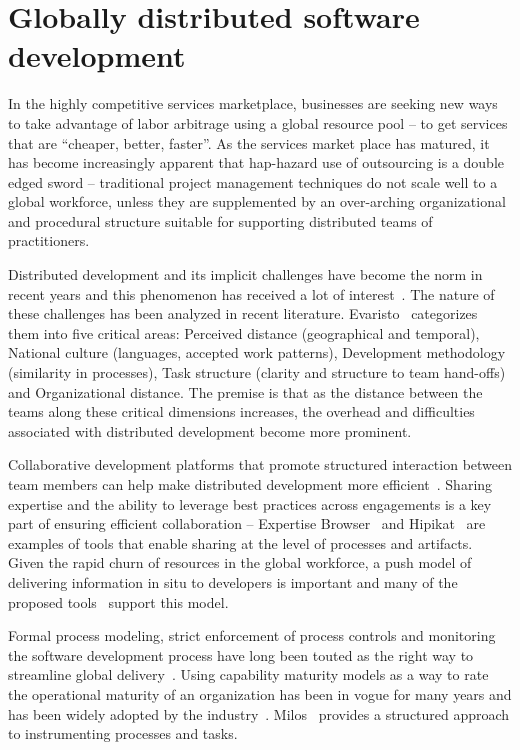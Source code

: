 \section{Globally distributed software development}
In the highly competitive services marketplace, businesses are seeking new ways to take advantage of labor arbitrage using a global resource pool – to get services that are “cheaper, better, faster”.  As the services market place has matured, it has become increasingly apparent that hap-hazard use of outsourcing is a double edged sword – traditional project management techniques do not scale well to a global workforce, unless they are supplemented by an over-arching organizational and procedural structure suitable for supporting distributed teams of practitioners.  

Distributed development and its implicit challenges have become the norm in recent years and this phenomenon has received a lot of interest~\cite{glo24,glo26}. The nature of these challenges has been analyzed in recent literature. Evaristo~\cite{glo27} categorizes them into five critical areas: Perceived distance (geographical and temporal), National culture (languages, accepted work patterns), Development methodology (similarity in processes), Task structure (clarity and structure to team hand-offs) and Organizational distance. The premise is that as the distance between the teams along these critical dimensions increases, the overhead and difficulties associated with distributed development become more prominent.

Collaborative development platforms that promote structured interaction between team members can help make distributed development more efficient~\cite{glo28,glo29}. Sharing expertise and the ability to leverage best practices across engagements is a key part of ensuring efficient collaboration – Expertise Browser~\cite{glo30} and Hipikat~\cite{glo31} are examples of tools that enable sharing at the level of processes and artifacts. Given the rapid churn of resources in the global workforce, a push model of delivering information in situ to developers is important and many of the proposed tools~\cite{glo29,glo31,glo34} support this model.

Formal process modeling, strict enforcement of process controls and monitoring the software development process have long been touted as the right way to streamline global delivery~\cite{glo32,glo33,glo34}. Using capability maturity models as a way to rate the operational maturity of an organization has been in vogue for many years and has been widely adopted by the industry~\cite{glo35}. Milos~\cite{glo34} provides a structured approach to instrumenting processes and tasks.

